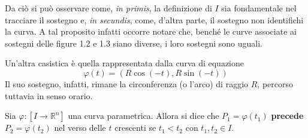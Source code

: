 Da ciò si può osservare come, \textit{in primis}, la definizione di $I$ sia fondamentale nel tracciare il sostegno e, \textit{in secundis}, come, d'altra parte, il sostegno non identifichi la curva. A tal proposito infatti occorre notare che, benché le curve associate ai sostegni delle figure 1.2 e 1.3 siano diverse, i loro sostegni sono uguali.
\begin{example}    
    Un'altra casistica è quella rappresentata dalla curva di equazione
    \begin{equation*}    
    \varphi(t)=(R \cos(-t), R \sin(-t)) 
    \end{equation*}
    Il suo sostegno, infatti, rimane la circonferenza (o l'arco) di raggio $R$, percorso tuttavia in senso orario.
\end{example}
\begin{definition}
    Sia $\varphi:[I \to \mathbb{R}^n]$ una curva parametrica. Allora si dice che $P_1=\varphi(t_1)$ \textbf{precede} $P_2=\varphi(t_2)$ nel verso delle $t$ crescenti se $t_1<t_2$ con $t_1, t_2 \in I$.
\end{definition}
